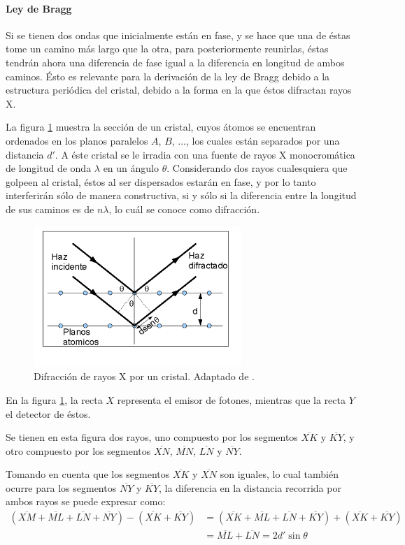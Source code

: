 \documentclass[../main.tex]{subfiles}
\begin{document}
\paragraph{Ley de Bragg}
Si se tienen dos ondas que inicialmente están en fase, y se hace que una de éstas tome un camino más largo que la otra, para posteriormente reunirlas, éstas tendrán ahora una diferencia de fase igual a la diferencia en longitud de ambos caminos. Ésto es relevante para la derivación de la ley de Bragg debido a la estructura periódica del cristal, debido a la forma en la que éstos difractan rayos X.

La figura \ref{fig:braggdiag} muestra la sección de un cristal, cuyos átomos se encuentran ordenados en los planos paralelos $A$, $B$, ..., los cuales están separados por una distancia $d'$. A éste cristal se le irradia con una fuente de rayos X monocromática de longitud de onda $\lambda$ en un ángulo $\theta$. Considerando dos rayos cualesquiera que golpeen al cristal, éstos al ser dispersados estarán en fase, y por lo tanto interferirán sólo de manera constructiva, si y sólo si la diferencia entre la longitud de sus caminos es de $n\lambda$, lo cuál se conoce como difracción.
\begin{figure}[H]
    \centering
    \includegraphics[width=0.7\textwidth]{fig/braggdiag.png}
    \caption{Difracción de rayos X por un cristal. Adaptado de \cite{Cullity2014}.}
    \label{fig:braggdiag}
\end{figure}
En la figura \ref{fig:braggdiag}, la recta $X$ representa el emisor de fotones, mientras que la recta $Y$ el detector de éstos.

Se tienen en esta figura dos rayos, uno compuesto por los segmentos $\overline{XK}$ y $\overline{KY}$, y otro compuesto por los segmentos $\overline{XN}$, $\overline{MN}$, $\overline{LN}$ y $\overline{NY}$.

Tomando en cuenta que los segmentos $\overline{XK}$ y $\overline{XN}$ son iguales, lo cual también ocurre para los segmentos $\overline{NY}$ y $\overline{KY}$, la diferencia en la distancia recorrida por ambos rayos se puede expresar como:
\begin{equation}
    \begin{split}
        (\overline{XM}+\overline{ML}+\overline{LN}+\overline{NY})-(\overline{XK}+\overline{KY})&=(\overline{XK}+\overline{ML}+\overline{LN}+\overline{KY})+(\overline{XK}+\overline{KY})\\
        &=\overline{ML}+\overline{LN}=2d'\sin{\theta}
    \end{split}
    \label{eq:rayosbragg}
\end{equation}
\end{document}
